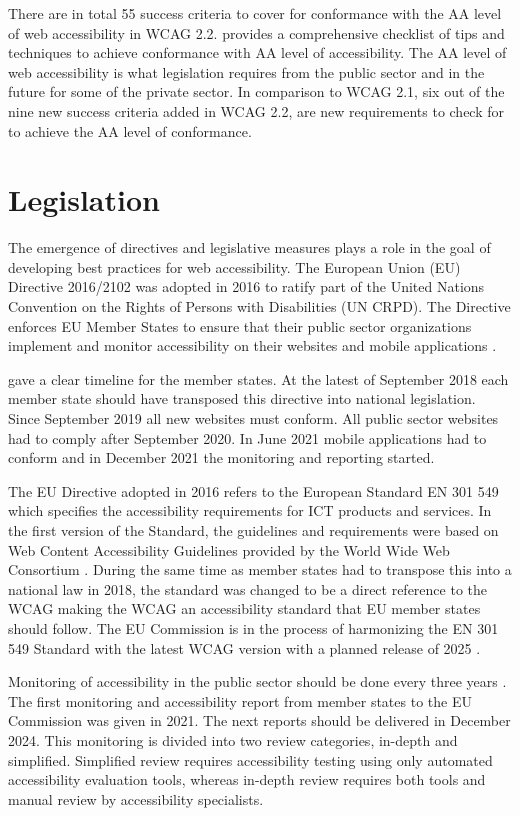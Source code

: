 There are in total 55 success criteria to cover for conformance with the AA level of web accessibility in WCAG 2.2. \textcite{wcag_checklist} provides a comprehensive checklist of tips and techniques to achieve conformance with AA level of accessibility. The AA level of web accessibility is what legislation requires from the public sector and in the future for some of the private sector. In comparison to WCAG 2.1, six out of the nine new success criteria added in WCAG 2.2, are new requirements to check for to achieve the AA level of conformance.


\section{Legislation}

The emergence of directives and legislative measures plays a role in the goal of developing best practices for web accessibility. The European Union (EU) Directive 2016/2102 was adopted in 2016 to ratify part of the United Nations Convention on the Rights of Persons with Disabilities (UN CRPD). The Directive enforces EU Member States to ensure that their public sector organizations implement and monitor accessibility on their websites and mobile applications \citep{eudirective2016}. 

\textcite{eudirective2016} gave a clear timeline for the member states. At the latest of September 2018 each member state should have transposed this directive into national legislation. Since September 2019 all new websites must conform. All public sector websites had to comply after September 2020. In June 2021 mobile applications had to conform and in December 2021 the monitoring and reporting started. 

The EU Directive adopted in 2016 refers to the European Standard EN 301 549 which specifies the accessibility requirements for ICT products and services. In the first version of the Standard, the guidelines and requirements were based on Web Content Accessibility Guidelines provided by the World Wide Web Consortium \citep{wcagadoptioneurope}. During the same time as member states had to transpose this into a national law in 2018, the standard was changed to be a direct reference to the WCAG making the WCAG an accessibility standard that EU member states should follow. The EU Commission is in the process of harmonizing the EN 301 549 Standard with the latest WCAG version with a planned release of 2025 \citep{etsi_standard}.

Monitoring of accessibility in the public sector should be done every three years \citep{eudirectivemonitoring}. The first monitoring and accessibility report from member states to the EU Commission was given in 2021. The next reports should be delivered in December 2024. This monitoring is divided into two review categories, in-depth and simplified. Simplified review requires accessibility testing using only automated accessibility evaluation tools, whereas in-depth review requires both tools and manual review by accessibility specialists. 

